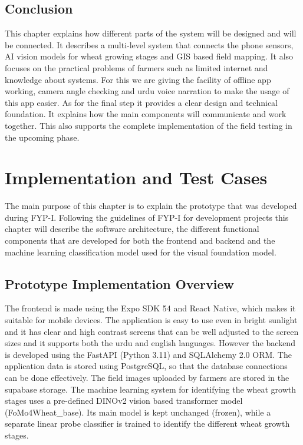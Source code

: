 \documentclass{FastFyp}
\begin{document}
\section{Conclusion}
This chapter explains how different parts of the system will be designed and will be connected. It describes a multi-level system that connects the phone sensors, AI vision models for wheat growing stages and GIS based field mapping. It also focuses on the practical problems of farmers such as limited internet and knowledge about systems. For this we are giving the facility of offline app working, camera angle checking and urdu voice narration to make the usage of this app easier. As for the final step it provides a clear design and technical foundation. It explains how the main components will communicate and work together. This also supports the complete implementation of the field testing in the upcoming phase. 

\chapter{Implementation and Test Cases}
The main purpose of this chapter is to explain the prototype that was developed during FYP-I. Following the guidelines of FYP-I for development projects this chapter will describe the software architecture, the different functional components that are developed for both the frontend and backend and the machine learning classification model used for the visual foundation model.

\section{Prototype Implementation Overview}
The frontend is made using the Expo SDK 54 and React Native, which makes it suitable for mobile devices. The application is easy to use even in bright sunlight and it has clear and high contrast screens that can be well adjusted to the screen sizes and it supports both the urdu and english languages. However the backend is developed using the FastAPI (Python 3.11) and SQLAlchemy 2.0 ORM. The application data is stored using PostgreSQL, so that the database connections can be done effectively. The field images uploaded by farmers are stored in the supabase storage. The machine learning system for identifying the wheat growth stages uses a pre-defined DINOv2 vision based transformer model (FoMo4Wheat\_base). Its main model is kept unchanged (frozen), while a separate linear probe classifier is trained to identify the different wheat growth stages. 
\end{document}
